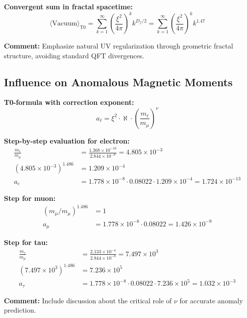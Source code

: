\documentclass[12pt,a4paper]{article}
\newcommand{\xipar}{\xi}            %
\newcommand{\nulep}{\nu}            %
\begin{document}
\textbf{Convergent sum in fractal spacetime:}
\begin{equation}
	\langle \text{Vacuum} \rangle_{\text{T0}} = \sum_{k=1}^{\infty} \left( \frac{\xi^2}{4\pi} \right)^k k^{D_f/2} = \sum_{k=1}^{\infty} \left( \frac{\xi^2}{4\pi} \right)^k k^{1.47}
\end{equation}

\textbf{Comment:} Emphasize natural UV regularization through geometric fractal structure, avoiding standard QFT divergences.

\subsection{Influence on Anomalous Magnetic Moments}

\textbf{T0-formula with correction exponent:}
\begin{equation}
	a_\ell = \xipar^2 \cdot \aleph \cdot \left( \frac{m_\ell}{m_\mu} \right)^\nulep
\end{equation}

\textbf{Step-by-step evaluation for electron:}
\begin{align}
	\frac{m_e}{m_\mu} &= \frac{1.368 \times 10^{-10}}{2.844 \times 10^{-8}} = 4.805 \times 10^{-3} \\
	(4.805 \times 10^{-3})^{1.486} &= 1.209 \times 10^{-4} \\
	a_e &= 1.778 \times 10^{-8} \cdot 0.08022 \cdot 1.209 \times 10^{-4} = 1.724 \times 10^{-13}
\end{align}

\textbf{Step for muon:}
\begin{align}
	(m_\mu/m_\mu)^{1.486} &= 1 \\
	a_\mu &= 1.778 \times 10^{-8} \cdot 0.08022 = 1.426 \times 10^{-9}
\end{align}

\textbf{Step for tau:}
\begin{align}
	\frac{m_\tau}{m_\mu} &= \frac{2.133 \times 10^{-4}}{2.844 \times 10^{-8}} = 7.497 \times 10^3 \\
	(7.497 \times 10^3)^{1.486} &= 7.236 \times 10^5 \\
	a_\tau &= 1.778 \times 10^{-8} \cdot 0.08022 \cdot 7.236 \times 10^5 = 1.032 \times 10^{-3}
\end{align}

\textbf{Comment:} Include discussion about the critical role of $\nulep$ for accurate anomaly prediction.
\end{document}
